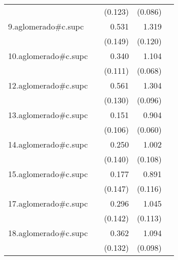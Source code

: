 {\begin{longtable}{l*{4}{D{.}{.}{-1}}}
            &                     &     (0.123)         &     (0.086)         &                     \\
\addlinespace
9.aglomerado#c.supc&                     &       0.531\sym{***}&       1.319\sym{***}&                     \\
            &                     &     (0.149)         &     (0.120)         &                     \\
\addlinespace
10.aglomerado#c.supc&                     &       0.340\sym{**} &       1.104\sym{***}&                     \\
            &                     &     (0.111)         &     (0.068)         &                     \\
\addlinespace
12.aglomerado#c.supc&                     &       0.561\sym{***}&       1.304\sym{***}&                     \\
            &                     &     (0.130)         &     (0.096)         &                     \\
\addlinespace
13.aglomerado#c.supc&                     &       0.151         &       0.904\sym{***}&                     \\
            &                     &     (0.106)         &     (0.060)         &                     \\
\addlinespace
14.aglomerado#c.supc&                     &       0.250         &       1.002\sym{***}&                     \\
            &                     &     (0.140)         &     (0.108)         &                     \\
\addlinespace
15.aglomerado#c.supc&                     &       0.177         &       0.891\sym{***}&                     \\
            &                     &     (0.147)         &     (0.116)         &                     \\
\addlinespace
17.aglomerado#c.supc&                     &       0.296\sym{*}  &       1.045\sym{***}&                     \\
            &                     &     (0.142)         &     (0.113)         &                     \\
\addlinespace
18.aglomerado#c.supc&                     &       0.362\sym{**} &       1.094\sym{***}&                     \\
            &                     &     (0.132)         &     (0.098)         &                     \\

\end{longtable}}
